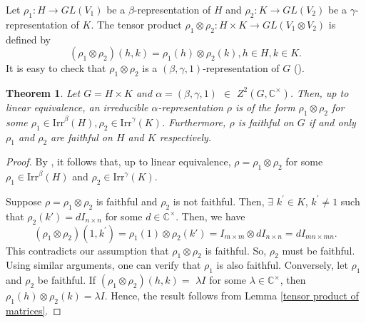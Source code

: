 \documentclass[a4paper,11pt]{amsart}
\numberwithin{equation}{section}
\numberwithin{equation}{subsection}
\newtheorem{theorem}{Theorem}[section]
\newtheorem{remark}[theorem]{Remark}
\begin{document}
	Let $\rho_1: H \to GL(V_1)$ be a $\beta$-representation of $H$ and $\rho_2: K \to GL(V_2)$ be a $\gamma$-representation of $K$. The tensor product $\rho_1 \otimes \rho_2: H \times K \to GL(V_1\otimes V_2)$ is defined by $$(\rho_1 \otimes \rho_2) (h,k)= \rho_1(h) \otimes \rho_2(k), h \in H, k \in K.$$ It is easy to check that $\rho_1 \otimes \rho_2$ is a $(\beta, \gamma, 1)$-representation of $G$
	(\cite[Chapter 5, Section 1]{karpilovsky}).
	
	
	\begin{theorem} \label{tensor product is faithful} 
		Let $G = H \times K$ and $\alpha = (\beta,\gamma,1)$ $\in$ $Z^{2}(G,\mathbb{C}^{\times})$. Then, up to linear equivalence, an irreducible $\alpha$-representation $\rho$ is of the form $\rho_1 \otimes \rho_2$ for some $\rho_1\in \mathrm{Irr}^\beta(H), \rho_2\in \mathrm{Irr}^\gamma(K)$. Furthermore,
		$\rho$ is faithful on $G$ if and only $\rho_1$ and $\rho_2$ are faithful on $H$ and $K$ respectively.
	\end{theorem}
	
	\begin{proof}
		By \cite[Chapter 5, Corollary 1.3]{karpilovsky}, it follows that, up to linear equivalence, $\rho= \rho_1 \otimes \rho_2$ for some $\rho_1 \in \mathrm{Irr}^\beta(H)$ and $\rho_2 \in \mathrm{Irr}^\gamma(K)$. 
		
		
		Suppose $\rho= \rho_1 \otimes \rho_2$ is faithful and $\rho_2$ is not faithful.
		Then, $\exists$ $k^{\prime} \in K$, $k^{\prime} \neq 1$ such that $\rho_{2}(k')= d I_{n \times n}$ for some $d \in \mathbb{C}^{\times}$. Then, we have $$(\rho_1 \otimes \rho_{2})\left(1,k^{\prime}\right)= \rho_{1}\left(1\right) \otimes \rho_{2}(k') = I_{m\times m}  \otimes d I_{n \times n}= d I_{m n \times m n}.$$ 
		This contradicts our assumption that $\rho_{1} \otimes \rho_{2}$ is faithful. So, $\rho_{2}$ must be faithful. Using similar arguments, one can verify that $\rho_{1}$ is also faithful.
		Conversely, let $\rho_1$ and $\rho_2$ be faithful.
		If $(\rho_{1} \otimes \rho_{2})(h,k)=$ $\lambda I$ for some $\lambda \in \mathbb{C}^{\times}$, then $\rho_{1}(h) \otimes \rho_{2}(k) = \lambda I$. Hence, the result follows from Lemma \ref{tensor product of matrices}. 
	\end{proof}
	
\end{document}
